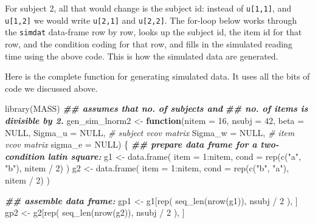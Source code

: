 \documentclass[
  12pt,
]{krantz}
\newenvironment{Shaded}{\begin{snugshade}}{\end{snugshade}}
\newcommand{\AttributeTok}[1]{\textcolor[rgb]{0.77,0.63,0.00}{#1}}
\newcommand{\CommentTok}[1]{\textcolor[rgb]{0.56,0.35,0.01}{\textit{#1}}}
\newcommand{\ConstantTok}[1]{\textcolor[rgb]{0.00,0.00,0.00}{#1}}
\newcommand{\ControlFlowTok}[1]{\textcolor[rgb]{0.13,0.29,0.53}{\textbf{#1}}}
\newcommand{\DecValTok}[1]{\textcolor[rgb]{0.00,0.00,0.81}{#1}}
\newcommand{\DocumentationTok}[1]{\textcolor[rgb]{0.56,0.35,0.01}{\textbf{\textit{#1}}}}
\newcommand{\FunctionTok}[1]{\textcolor[rgb]{0.00,0.00,0.00}{#1}}
\newcommand{\NormalTok}[1]{#1}
\newcommand{\OtherTok}[1]{\textcolor[rgb]{0.56,0.35,0.01}{#1}}
\newcommand{\SpecialCharTok}[1]{\textcolor[rgb]{0.00,0.00,0.00}{#1}}
\newcommand{\StringTok}[1]{\textcolor[rgb]{0.31,0.60,0.02}{#1}}
\theoremstyle{definition}
\theoremstyle{definition}
\theoremstyle{definition}
\theoremstyle{definition}
\theoremstyle{remark}
\begin{document}
For subject 2, all that would change is the subject id: instead of \texttt{u{[}1,1{]}}, and \texttt{u{[}1,2{]}} we would write \texttt{u{[}2,1{]}} and \texttt{u{[}2,2{]}}. The for-loop below works through the \texttt{simdat} data-frame row by row, looks up the subject id, the item id for that row, and the condition coding for that row, and fills in the simulated reading time using the above code. This is how the simulated data are generated.

Here is the complete function for generating simulated data. It uses all the bits of code we discussed above.

\begin{Shaded}
\begin{Highlighting}[]
\FunctionTok{library}\NormalTok{(MASS)}
\DocumentationTok{\#\# assumes that no. of subjects and}
\DocumentationTok{\#\# no. of items is divisible by 2.}
\NormalTok{gen\_sim\_lnorm2 }\OtherTok{\textless{}{-}} \ControlFlowTok{function}\NormalTok{(}\AttributeTok{nitem =} \DecValTok{16}\NormalTok{,}
                           \AttributeTok{nsubj =} \DecValTok{42}\NormalTok{,}
                           \AttributeTok{beta =} \ConstantTok{NULL}\NormalTok{,}
                           \AttributeTok{Sigma\_u =} \ConstantTok{NULL}\NormalTok{, }\CommentTok{\# subject vcov matrix}
                           \AttributeTok{Sigma\_w =} \ConstantTok{NULL}\NormalTok{, }\CommentTok{\# item vcov matrix}
                           \AttributeTok{sigma\_e =} \ConstantTok{NULL}\NormalTok{) \{}
  \DocumentationTok{\#\# prepare data frame for a two{-}condition latin square:}
\NormalTok{  g1 }\OtherTok{\textless{}{-}} \FunctionTok{data.frame}\NormalTok{(}
    \AttributeTok{item =} \DecValTok{1}\SpecialCharTok{:}\NormalTok{nitem,}
    \AttributeTok{cond =} \FunctionTok{rep}\NormalTok{(}\FunctionTok{c}\NormalTok{(}\StringTok{"a"}\NormalTok{, }\StringTok{"b"}\NormalTok{), nitem }\SpecialCharTok{/} \DecValTok{2}\NormalTok{)}
\NormalTok{  )}
\NormalTok{  g2 }\OtherTok{\textless{}{-}} \FunctionTok{data.frame}\NormalTok{(}
    \AttributeTok{item =} \DecValTok{1}\SpecialCharTok{:}\NormalTok{nitem,}
    \AttributeTok{cond =} \FunctionTok{rep}\NormalTok{(}\FunctionTok{c}\NormalTok{(}\StringTok{"b"}\NormalTok{, }\StringTok{"a"}\NormalTok{), nitem }\SpecialCharTok{/} \DecValTok{2}\NormalTok{)}
\NormalTok{  )}


  \DocumentationTok{\#\# assemble data frame:}
\NormalTok{  gp1 }\OtherTok{\textless{}{-}}\NormalTok{ g1[}\FunctionTok{rep}\NormalTok{(}
    \FunctionTok{seq\_len}\NormalTok{(}\FunctionTok{nrow}\NormalTok{(g1)),}
\NormalTok{    nsubj }\SpecialCharTok{/} \DecValTok{2}
\NormalTok{  ), ]}
\NormalTok{  gp2 }\OtherTok{\textless{}{-}}\NormalTok{ g2[}\FunctionTok{rep}\NormalTok{(}
    \FunctionTok{seq\_len}\NormalTok{(}\FunctionTok{nrow}\NormalTok{(g2)),}
\NormalTok{    nsubj }\SpecialCharTok{/} \DecValTok{2}
\NormalTok{  ), ]}


\end{Highlighting}
\end{Shaded}
\end{document}
